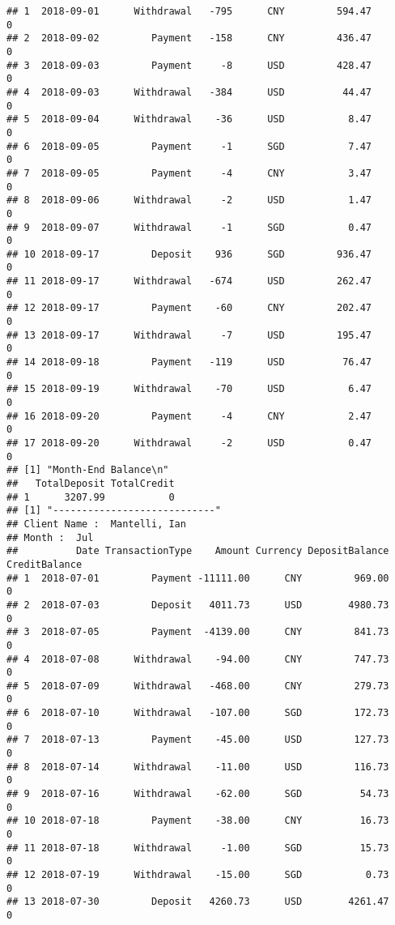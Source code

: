 \documentclass[]{article}
\begin{document}
\begin{verbatim}
## 1  2018-09-01      Withdrawal   -795      CNY         594.47             0
## 2  2018-09-02         Payment   -158      CNY         436.47             0
## 3  2018-09-03         Payment     -8      USD         428.47             0
## 4  2018-09-03      Withdrawal   -384      USD          44.47             0
## 5  2018-09-04      Withdrawal    -36      USD           8.47             0
## 6  2018-09-05         Payment     -1      SGD           7.47             0
## 7  2018-09-05         Payment     -4      CNY           3.47             0
## 8  2018-09-06      Withdrawal     -2      USD           1.47             0
## 9  2018-09-07      Withdrawal     -1      SGD           0.47             0
## 10 2018-09-17         Deposit    936      SGD         936.47             0
## 11 2018-09-17      Withdrawal   -674      USD         262.47             0
## 12 2018-09-17         Payment    -60      CNY         202.47             0
## 13 2018-09-17      Withdrawal     -7      USD         195.47             0
## 14 2018-09-18         Payment   -119      USD          76.47             0
## 15 2018-09-19      Withdrawal    -70      USD           6.47             0
## 16 2018-09-20         Payment     -4      CNY           2.47             0
## 17 2018-09-20      Withdrawal     -2      USD           0.47             0
## [1] "Month-End Balance\n"
##   TotalDeposit TotalCredit
## 1      3207.99           0
## [1] "----------------------------"
## Client Name :  Mantelli, Ian 
## Month :  Jul 
##          Date TransactionType    Amount Currency DepositBalance CreditBalance
## 1  2018-07-01         Payment -11111.00      CNY         969.00             0
## 2  2018-07-03         Deposit   4011.73      USD        4980.73             0
## 3  2018-07-05         Payment  -4139.00      CNY         841.73             0
## 4  2018-07-08      Withdrawal    -94.00      CNY         747.73             0
## 5  2018-07-09      Withdrawal   -468.00      CNY         279.73             0
## 6  2018-07-10      Withdrawal   -107.00      SGD         172.73             0
## 7  2018-07-13         Payment    -45.00      USD         127.73             0
## 8  2018-07-14      Withdrawal    -11.00      USD         116.73             0
## 9  2018-07-16      Withdrawal    -62.00      SGD          54.73             0
## 10 2018-07-18         Payment    -38.00      CNY          16.73             0
## 11 2018-07-18      Withdrawal     -1.00      SGD          15.73             0
## 12 2018-07-19      Withdrawal    -15.00      SGD           0.73             0
## 13 2018-07-30         Deposit   4260.73      USD        4261.47             0

\end{verbatim}
\end{document}
